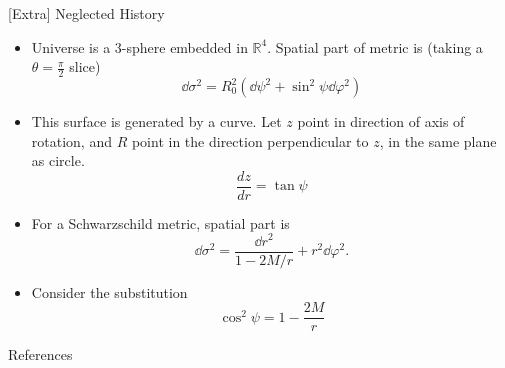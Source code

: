 \documentclass[aspectratio=169,xcolor=dvipsnames]{beamer}
\begin{document}
\begin{frame}{[Extra] Neglected History}
    \begin{itemize}
        \item Universe is a 3-sphere embedded in $\mathbb{R}^4.$ Spatial part of metric is (taking a $\theta=\frac{\pi}{2}$ slice)
        \begin{equation}
            \dd{\sigma}^2 = R_0^2\left(\dd{\psi}^2 + \sin^2\psi\dd{\varphi}^2\right)
        \end{equation}
        \item This surface is generated by a curve. Let $z$ point in direction of axis of rotation, and $R$ point in the direction perpendicular to $z$, in the same plane as circle.
        \begin{equation}
            \frac{dz}{dr} = \tan\psi
        \end{equation}
        \item For a Schwarzschild metric, spatial part is 
        \begin{equation}
            \dd{\sigma}^2 = \frac{\dd{r}^2}{1-2M/r} + r^2\dd{\varphi}^2.
        \end{equation}
        \item Consider the substitution 
        \begin{equation}
            \cos^2\psi = 1 - \frac{2M}{r}
        \end{equation}
    \end{itemize}
\end{frame}
\begin{frame}{References}
    \nocite{*}
    
\end{frame}
\end{document}
